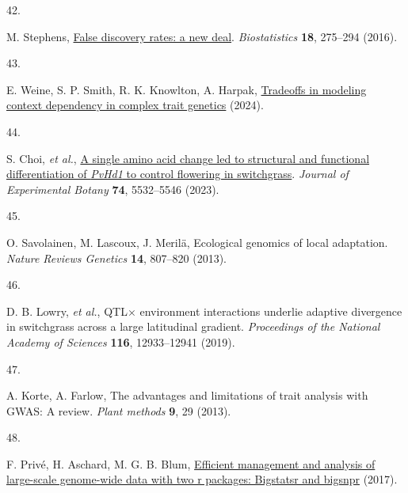 \documentclass[
  9pt,
  twocolumn,
  twoside]{pnas-new}
\newlength{\cslhangindent}
\newlength{\csllabelwidth}
\newenvironment{CSLReferences}[2] %
 {\begin{list}{}{%
  \setlength{\itemindent}{0pt}
  \setlength{\leftmargin}{0pt}
  \setlength{\parsep}{0pt}
  \ifodd #1
   \setlength{\leftmargin}{\cslhangindent}
   \setlength{\itemindent}{-1\cslhangindent}
  \fi
  \setlength{\itemsep}{#2\baselineskip}}}
 {\end{list}}
\newcommand{\CSLLeftMargin}[1]{\parbox[t]{\csllabelwidth}{\strut#1\strut}}
\newcommand{\CSLRightInline}[1]{\parbox[t]{\linewidth - \csllabelwidth}{\strut#1\strut}}
\begin{document}
\begin{CSLReferences}{0}{1}
\CSLLeftMargin{42. }%
\CSLRightInline{M. Stephens,
\href{https://doi.org/10.1093/biostatistics/kxw041}{{False discovery
rates: a new deal}}. \emph{Biostatistics} \textbf{18}, 275--294 (2016).}

\CSLLeftMargin{43. }%
\CSLRightInline{E. Weine, S. P. Smith, R. K. Knowlton, A. Harpak,
\href{http://dx.doi.org/10.7554/eLife.99210.1}{Tradeoffs in modeling
context dependency in complex trait genetics} (2024).}

\CSLLeftMargin{44. }%
\CSLRightInline{S. Choi, \emph{et al.},
\href{https://doi.org/10.1093/jxb/erad255}{A single amino acid change
led to structural and functional differentiation of {\emph{PvHd1}} to
control flowering in switchgrass}. \emph{Journal of Experimental Botany}
\textbf{74}, 5532--5546 (2023).}

\CSLLeftMargin{45. }%
\CSLRightInline{O. Savolainen, M. Lascoux, J. Merilä, Ecological
genomics of local adaptation. \emph{Nature Reviews Genetics}
\textbf{14}, 807--820 (2013).}

\CSLLeftMargin{46. }%
\CSLRightInline{D. B. Lowry, \emph{et al.}, QTL\(\times\) environment
interactions underlie adaptive divergence in switchgrass across a large
latitudinal gradient. \emph{Proceedings of the National Academy of
Sciences} \textbf{116}, 12933--12941 (2019).}

\CSLLeftMargin{47. }%
\CSLRightInline{A. Korte, A. Farlow, The advantages and limitations of
trait analysis with GWAS: A review. \emph{Plant methods} \textbf{9}, 29
(2013).}

\CSLLeftMargin{48. }%
\CSLRightInline{F. Privé, H. Aschard, M. G. B. Blum,
\href{http://dx.doi.org/10.1101/190926}{Efficient management and
analysis of large-scale genome-wide data with two r packages: Bigstatsr
and bigsnpr} (2017).}

\end{CSLReferences}


\showacknow{} %
\end{document}
